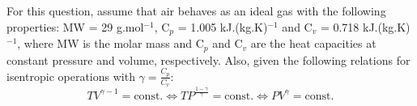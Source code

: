 \documentclass[calculator,steamtables,refrigeranttables,psychrometricchart,datasheet]{exam}
\begin{document}
\begin{question}
\begin{enumerate}[(i)]
\begin{enumerate}
{}
%
\end{enumerate}

\end{enumerate}
For this question, assume that air behaves as an ideal gas with the following properties: MW = 29 g.mol$^{-1}$, C$_{p}$ = 1.005 kJ.(kg.K)$^{-1}$ and C$_{v}$ = 0.718 kJ.(kg.K)$^{-1}$, where MW is the molar mass and C$_{p}$ and C$_{v}$ are the heat capacities at constant pressure and volume, respectively. Also, given the following relations for isentropic operations with $\gamma = \displaystyle\frac{C_{p}}{C_{v}}$:
\begin{displaymath}
TV^{\gamma-1}=\text{const.} \Leftrightarrow TP^{\frac{1-\gamma}{\gamma}}=\text{const.} \Leftrightarrow PV^{\gamma}=\text{const.} 
\end{displaymath}

\end{question}

\clearpage
\end{document}
